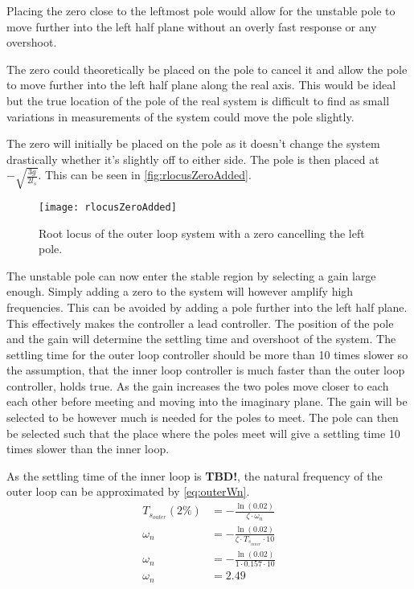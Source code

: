 Placing the zero close to the leftmost pole would allow for the unstable pole to move further into the left half plane without an overly fast response or any overshoot. 

The zero could theoretically be placed on the pole to cancel it and allow the pole to move further into the left half plane along the real axis. This would be ideal but the true location of the pole of the real system is difficult to find as small variations in measurements of the system could move the pole slightly. 

The zero will initially be placed on the pole as it doesn't change the system drastically whether it's slightly off to either side. The pole is then placed at $-\sqrt{\frac{3g}{2l_s}}$. This can be seen in \autoref{fig:rlocusZeroAdded}.

\begin{figure}[htbp]
\centering
\texttt{[image: rlocusZeroAdded]}
\caption{Root locus of the outer loop system with a zero cancelling the left pole.}
\label{fig:rlocusZeroAdded}
\end{figure}

The unstable pole can now enter the stable region by selecting a gain large enough. Simply adding a zero to the system will however amplify high frequencies. This can be avoided by adding a pole further into the left half plane. This effectively makes the controller a lead controller. The position of the pole and the gain will determine the settling time and overshoot of the system. The settling time for the outer loop controller should be more than 10 times slower so the assumption, that the inner loop controller is much faster than the outer loop controller, holds true. As the gain increases the two poles move closer to each each other before meeting and moving into the imaginary plane. The gain will be selected to be however much is needed for the poles to meet. The pole can then be selected such that the place where the poles meet will give a settling time 10 times slower than the inner loop.

As the settling time of the inner loop is \textbf{TBD!}, the natural frequency of the outer loop can be approximated by \autoref{eq:outerWn}. 
\begin{subequations} \label{eq:outerWn}
\begin{flalign}
T_{s_{outer}}(2\%) &=-\frac{\ln(0.02)}{\zeta\cdot \omega_n} \\
\omega_n &=-\frac{\ln(0.02)}{\zeta\cdot T_{s_{inner}}\cdot 10} \\
\omega_n &=-\frac{\ln(0.02)}{1\cdot 0.157 \cdot 10} \\
\omega_n &=2.49
\end{flalign}
\end{subequations}

